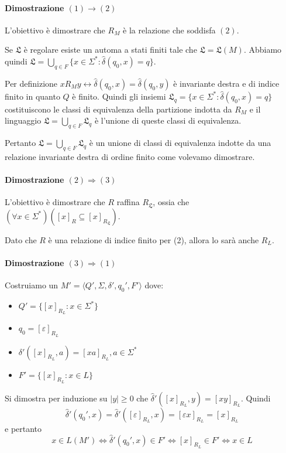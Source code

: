 \documentclass[a4paper, 10pt]{report}
\begin{document}
\begin{tcolorbox}
\paragraph*{Dimostrazione $(1) \rightarrow (2)$} L'obiettivo è dimostrare che $R_M$ è la relazione che soddisfa $(2)$.

Se $\mathfrak{L}$ è regolare esiste un automa a stati finiti tale che $\mathfrak{L}=\mathfrak{L}(M)$. Abbiamo quindi $\mathfrak{L}=\bigcup_{q\in F} \{x\in\Sigma^*:\hat\delta(q_0,x)=q\}$.
	
	Per definizione $xR_My \longleftrightarrow\hat\delta(q_0,x)=\hat\delta(q_0,y)$ è invariante destra e di indice finito in quanto $Q$ è finito. Quindi gli insiemi $\mathfrak{L}_q =\{x\in\Sigma^*:\hat\delta(q_0,x)=q\}$ costituiscono le classi di equivalenza della partizione indotta da $R_M$ e  il linguaggio $\mathfrak{L}=\bigcup_{q\in F}\mathfrak{L}_q$ è l'unione di queste classi di equivalenza. 
	
	Pertanto $\mathfrak{L}=\bigcup_{q\in F}\mathfrak{L}_q$ è un unione di classi di equivalenza indotte da una relazione invariante destra di ordine finito come volevamo dimostrare. \\
	
\paragraph*{Dimostrazione $(2)\Rightarrow(3)$} L'obiettivo è dimostrare che $R$ raffina $R_\mathfrak{L}$, ossia che $(\forall x\in\Sigma^*) ([x]_R\subseteq[x]_{R_\mathfrak{L}})$.

Dato che $R$ è una relazione di indice finito per (2), allora lo sarà anche $R_L$.\\
	
\paragraph*{Dimostrazione $(3)\Rightarrow(1)$} Costruiamo un $M'=\langle Q',\Sigma,\delta',q_0',F'\rangle$ dove:
	\begin{itemize}
		\item $Q' = \{[x]_{R_L}:x\in\Sigma^*\}$
		\item $q_0 = [\varepsilon]_{R_L}$
		\item $\delta'([x]_{R_L}, a) = [xa]_{R_L}, a\in\Sigma^*$
		\item $F'=\{[x]_{R_L}:x\in L\}$ 
	\end{itemize}

	Si dimostra per induzione su $|y|\geq0$ che $\hat\delta'([x]_{R_L},y)=[xy]_{R_L}$. Quindi
	\[
		\hat\delta'(q_0',x)=\hat\delta'([\varepsilon]_{R_L},x)=[\varepsilon x]_{R_L}=[x]_{R_L}
	\] 
	e pertanto 
	\[
		x\in L(M')\iff\hat\delta'(q_0',x)\in F'\iff [x]_{R_L}\in F' \iff x \in L
	\]
\end{tcolorbox}
\end{document}
